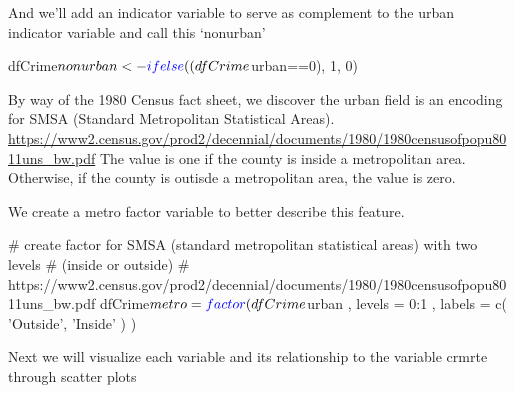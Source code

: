 \documentclass[]{article}
\newenvironment{Shaded}{}{}
\newcommand{\CommentTok}[1]{\textcolor[rgb]{0.00,0.50,0.00}{#1}}
\newcommand{\DataTypeTok}[1]{#1}
\newcommand{\DecValTok}[1]{#1}
\newcommand{\KeywordTok}[1]{\textcolor[rgb]{0.00,0.00,1.00}{#1}}
\newcommand{\NormalTok}[1]{#1}
\newcommand{\OperatorTok}[1]{#1}
\newcommand{\StringTok}[1]{\textcolor[rgb]{0.00,0.50,0.50}{#1}}
\begin{document}
And we'll add an indicator variable to serve as complement to the urban
indicator variable and call this `nonurban'

\begin{Shaded}
\begin{Highlighting}[]
\NormalTok{dfCrime}\OperatorTok{$}\NormalTok{nonurban <-}\StringTok{ }\KeywordTok{ifelse}\NormalTok{((dfCrime}\OperatorTok{$}\NormalTok{urban}\OperatorTok{==}\DecValTok{0}\NormalTok{), }\DecValTok{1}\NormalTok{, }\DecValTok{0}\NormalTok{)}
\end{Highlighting}
\end{Shaded}

By way of the 1980 Census fact sheet, we discover the urban field is an
encoding for SMSA (Standard Metropolitan Statistical Areas).
\url{https://www2.census.gov/prod2/decennial/documents/1980/1980censusofpopu8011uns_bw.pdf}
The value is one if the county is inside a metropolitan area. Otherwise,
if the county is outisde a metropolitan area, the value is zero.

We create a metro factor variable to better describe this feature.

\begin{Shaded}
\begin{Highlighting}[]
\CommentTok{# create factor for SMSA (standard metropolitan statistical areas) with two levels }
\CommentTok{# (inside or outside)}
\CommentTok{#    https://www2.census.gov/prod2/decennial/documents/1980/1980censusofpopu8011uns_bw.pdf}
\NormalTok{dfCrime}\OperatorTok{$}\NormalTok{metro =}
\StringTok{            }\KeywordTok{factor}\NormalTok{( dfCrime}\OperatorTok{$}\NormalTok{urban , }\DataTypeTok{levels =} \DecValTok{0}\OperatorTok{:}\DecValTok{1}\NormalTok{ , }\DataTypeTok{labels =}
                    \KeywordTok{c}\NormalTok{( }\StringTok{'Outside'}\NormalTok{,}
                       \StringTok{'Inside'}
\NormalTok{                      )}
\NormalTok{                   )}
\end{Highlighting}
\end{Shaded}

Next we will visualize each variable and its relationship to the
variable crmrte through scatter plots
\end{document}
